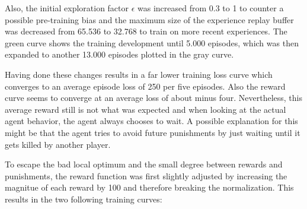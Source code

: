 Also, the initial exploration factor $\epsilon$ was increased from 0.3 to 1 to counter a possible pre-training bias and the maximum size of the experience replay buffer was decreased from 65.536 to 32.768 to train on more recent experiences. The green curve shows the training development until 5.000 episodes, which was then expanded to another 13.000 episodes plotted in the gray curve. 

Having done these changes results in a far lower training loss curve which converges to an average episode loss of 250 per five episodes. Also the reward curve seems to converge at an average loss of about minus four. Nevertheless, this average reward still is not what was expected and when looking at the actual agent behavior, the agent always chooses to wait. A possible explanation for this might be that the agent tries to avoid future punishments by just waiting until it gets killed by another player. 

To escape the bad local optimum and the small degree between rewards and punishments, the reward function was first slightly adjusted by increasing the magnitue of each reward by 100 and therefore breaking the normalization. This results in the two following training curves:

\newpage

